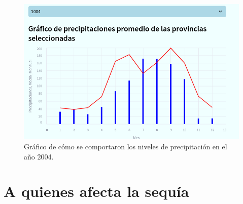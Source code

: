\documentclass[12pt]{article}
\begin{document}
	\begin{figure}
		\centering
		\includegraphics[width=0.7\linewidth]{images/2.png}
		\caption{Gráfico de cómo se comportaron los niveles de precipitación en el año 2004.}
	\end{figure}
	\newpage
	\section{A quienes afecta la sequía}
	
\end{document}
